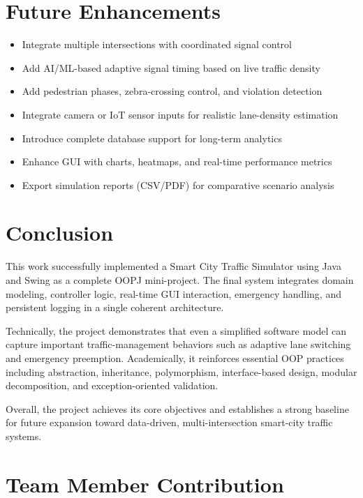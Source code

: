 \documentclass[12pt,a4paper]{article}
\begin{document}
\section{Future Enhancements}
\begin{itemize}
    \item Integrate multiple intersections with coordinated signal control
    \item Add AI/ML-based adaptive signal timing based on live traffic density
    \item Add pedestrian phases, zebra-crossing control, and violation detection
    \item Integrate camera or IoT sensor inputs for realistic lane-density estimation
    \item Introduce complete database support for long-term analytics
    \item Enhance GUI with charts, heatmaps, and real-time performance metrics
    \item Export simulation reports (CSV/PDF) for comparative scenario analysis
\end{itemize}

\section{Conclusion}
This work successfully implemented a Smart City Traffic Simulator using Java and Swing as a complete OOPJ mini-project. The final system integrates domain modeling, controller logic, real-time GUI interaction, emergency handling, and persistent logging in a single coherent architecture.

Technically, the project demonstrates that even a simplified software model can capture important traffic-management behaviors such as adaptive lane switching and emergency preemption. Academically, it reinforces essential OOP practices including abstraction, inheritance, polymorphism, interface-based design, modular decomposition, and exception-oriented validation.

Overall, the project achieves its core objectives and establishes a strong baseline for future expansion toward data-driven, multi-intersection smart-city traffic systems.

\newpage

\section{Team Member Contribution}
\end{document}

